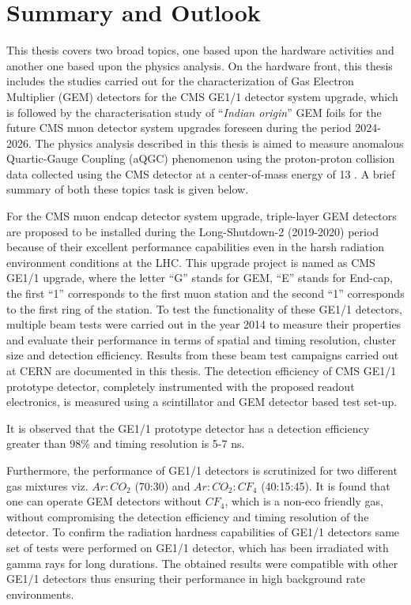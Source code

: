 \chapter{Summary and Outlook} %
\label{cha:summary_&_outlook}
This thesis covers two broad topics, one based upon the hardware activities and another one based upon the physics analysis. On the hardware front, this thesis includes the studies carried out for the characterization of Gas Electron Multiplier (GEM) detectors for the CMS GE1/1 detector system upgrade, which is followed by the characterisation study of ``\textit{Indian origin}'' GEM foils for the future CMS muon detector system upgrades foreseen during the period 2024-2026. The physics analysis described in this thesis is aimed to measure anomalous Quartic-Gauge Coupling (aQGC) phenomenon using the proton-proton collision data collected using the CMS detector at a center-of-mass energy of 13 \TeV. A brief summary of both these topics task is given below.

For the CMS muon endcap detector system upgrade, triple-layer GEM detectors are proposed to be installed during the Long-Shutdown-2 (2019-2020) period because of their excellent performance capabilities even in the harsh radiation environment conditions at the LHC. This upgrade project is named as CMS GE1/1 upgrade, where the letter “G” stands for GEM, ``E'' stands for End-cap, the first ``1'' corresponds to the first muon station and the second ``1'' corresponds to the first ring of the station. To test the functionality of these GE1/1 detectors, multiple beam tests were carried out in the year 2014 to measure their properties and evaluate their performance in terms of spatial and timing resolution, cluster size and detection efficiency. Results from these beam test campaigns carried out at CERN are documented in this thesis. The detection efficiency of CMS GE1/1 prototype detector, completely instrumented with the proposed readout electronics, is measured using a scintillator and GEM detector based test set-up.

It is observed that the GE1/1 prototype detector has a detection efficiency greater than 98\% and timing resolution is 5-7 ns.

Furthermore, the performance of GE1/1 detectors is scrutinized for two different gas mixtures viz. $Ar:CO_2$ (70:30) and $Ar:CO_2:CF_4$ (40:15:45). It is found that one can operate GEM detectors without $CF_4$, which is a non-eco friendly gas, without compromising the detection efficiency and timing resolution of the detector. To confirm the radiation hardness capabilities of GE1/1 detectors same set of tests were performed on GE1/1 detector, which has been irradiated with gamma rays for long durations. The obtained results were compatible with other GE1/1 detectors thus ensuring their performance in high background rate environments.

